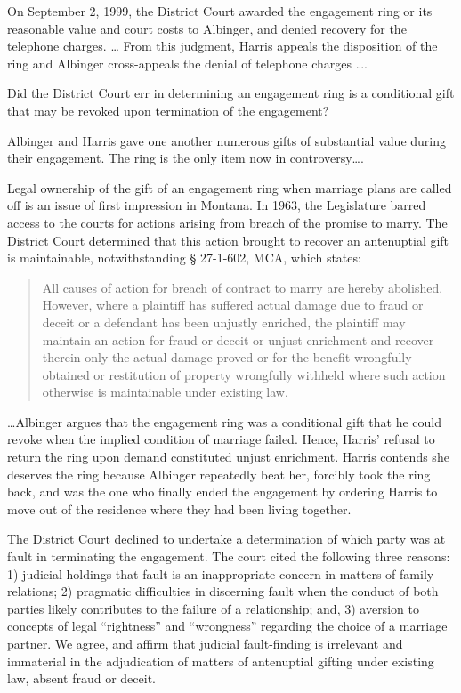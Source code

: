 On September 2, 1999, the District Court awarded the engagement ring or its
reasonable value and court costs to Albinger, and denied recovery for the
telephone charges. \dots{} From this judgment, Harris appeals the disposition
of the ring and Albinger cross-appeals the denial of telephone charges \dots{}.

Did the District Court err in determining an engagement ring is a conditional
gift that may be revoked upon termination of the engagement?

Albinger and Harris gave one another numerous gifts of substantial value during
their engagement. The ring is the only item now in controversy\dots{}. 

Legal ownership of the gift of an engagement ring when marriage plans are called
off is an issue of first impression in Montana. In 1963, the Legislature barred
access to the courts for actions arising from breach of the promise to marry.
The District Court determined that this action brought to recover an
antenuptial gift is maintainable, notwithstanding {\S} 27-1-602, MCA, which
states:

\begin{quote}
All causes of action for breach of contract to marry are hereby abolished.
However, where a plaintiff has suffered actual damage due to fraud or deceit or
a defendant has been unjustly enriched, the plaintiff may maintain an action
for fraud or deceit or unjust enrichment and recover therein only the actual
damage proved or for the benefit wrongfully obtained or restitution of property
wrongfully withheld where such action otherwise is maintainable under existing
law.
\end{quote}

\dots Albinger argues that the engagement ring was a conditional gift that he
could revoke when the implied condition of marriage failed. Hence, Harris'
refusal to return the ring upon demand constituted unjust enrichment. Harris
contends she deserves the ring because Albinger repeatedly beat her, forcibly
took the ring back, and was the one who finally ended the engagement by
ordering Harris to move out of the residence where they had been living
together.

The District Court declined to undertake a determination of which party was at
fault in terminating the engagement. The court cited the following three
reasons: 1) judicial holdings that fault is an inappropriate concern in matters
of family relations; 2) pragmatic difficulties in discerning fault when the
conduct of both parties likely contributes to the failure of a relationship;
and, 3) aversion to concepts of legal ``rightness'' and ``wrongness'' regarding
the choice of a marriage partner. We agree, and affirm that judicial
fault-finding is irrelevant and immaterial in the adjudication of matters of
antenuptial gifting under existing law, absent fraud or deceit.

